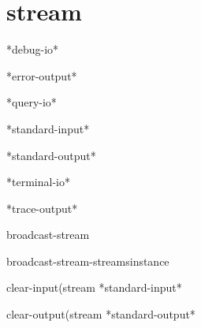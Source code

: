\section{stream}

\begin{variable}{*debug-io*}{}{}
  
\end{variable}

\begin{variable}{*error-output*}{}{}
  
\end{variable}

\begin{variable}{*query-io*}{}{}
  
\end{variable}

\begin{variable}{*standard-input*}{}{}
  
\end{variable}

\begin{variable}{*standard-output*}{}{}
  
\end{variable}

\begin{variable}{*terminal-io*}{}{}
  
\end{variable}

\begin{variable}{*trace-output*}{}{}
  
\end{variable}

\begin{class}{broadcast-stream}{}{}
  
\end{class}

\begin{function}{broadcast-stream-streams}{instance}{}
  
\end{function}

\begin{function}{clear-input}{\op (stream *standard-input*}{}
  
\end{function}

\begin{function}{clear-output}{\op (stream *standard-output*}{}
  
\end{function}

